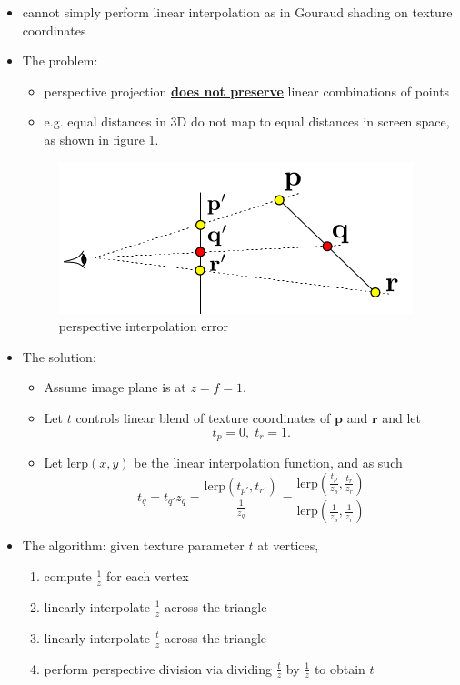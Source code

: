 \documentclass[twocolumn,landscape,10pt]{article}
\theoremstyle{definition}
\begin{document}
\begin{itemize}
    \item cannot simply perform linear interpolation as in Gouraud shading on
        texture coordinates
    \item The problem:
        \begin{itemize}
            \item perspective projection \underline{\textbf{does not preserve}}
                linear combinations of points
            \item e.g. equal distances in 3D do not
                map to equal distances in screen space, as shown in figure
                \ref{fig:inter_err}.
        \end{itemize} 
        \begin{figure}
          	\includegraphics[scale=0.55]{interpolation_error.png}
          	\centering
          	\caption{perspective interpolation error}\label{fig:inter_err}
        \end{figure}
    \item The solution: 
        \begin{itemize}
            \item Assume image plane is at $z=f=1$.
            \item Let $t$ controls linear blend of texture coordinates of
                $\mathbf{p}$ and $\mathbf{r}$ and let 
                \[
                    t_p=0,\; t_r=1.
                \]
            \item  Let $\text{lerp}(x,y)$
                be the linear interpolation function, and as such
                \[
                    t_q=t_{q'}z_q=
                    \frac{\text{lerp}(t_{p'},t_{r'})}{\frac{1}{z_q}}=
                    \frac{\text{lerp}(\frac{t_p}{z_p},\frac{t_r}{z_r})}{\text{lerp}(\frac{1}{z_p},\frac{1}{z_r})}
                \]
        \end{itemize} 
    \item The algorithm: given texture parameter $t$ at vertices,
        \begin{enumerate}
            \item compute $\frac{1}{z}$ for each vertex
            \item linearly interpolate $\frac{1}{z}$ across the triangle
            \item linearly interpolate $\frac{t}{z}$ across the triangle
            \item perform perspective division via dividing $\frac{t}{z}$ by
                $\frac{1}{z}$ to obtain $t$
        \end{enumerate} 
\end{itemize} 
\end{document}
